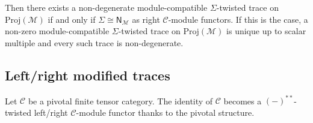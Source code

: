 \documentclass[11pt]{article}
\newcommand{\C}{\mathcal{C}}
\theoremstyle{definition}
\begin{document}
Then there exists a non-degenerate module-compatible $\Sigma$-twisted
trace on $\mathrm{Proj}(\mathcal{M})$ if and only if $\Sigma \cong \mathsf{N}_{\mathcal{M}}$ as right $\mathcal{C}$-module functors. If this is
the case, a non-zero module-compatible $\Sigma$-twisted trace on $\mathrm{Proj}(\mathcal{M})$ is unique up to
scalar multiple and every such trace is non-degenerate.



\subsection{Left/right modified traces}


Let $\C$ be a pivotal finite tensor category. The identity of $\C$ becomes a  $(-)^{**}$-twisted left/right  $\C$-module functor thanks to the pivotal structure.
\end{document}
